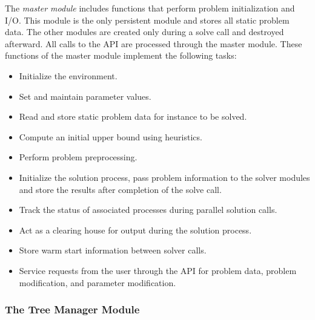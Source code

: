 The {\em master module} includes functions that perform problem initialization
and I/O. This module is the only persistent module and stores all static
problem data. The other modules are created only during a solve call and
destroyed afterward. All calls to the API are processed through the master
module. These functions of the master module implement the following tasks:
\begin{itemize}
        \item Initialize the environment.
        \item Set and maintain parameter values.
        \item Read and store static problem data for instance to be solved.
        \item Compute an initial upper bound using heuristics.
        \item Perform problem preprocessing.
        \item Initialize the solution process, pass problem information to the
        solver modules and store the results after completion of the solve 
	call.
        \item Track the status of associated processes during parallel
        solution calls.
        \item Act as a clearing house for output during the solution process.
        \item Store warm start information between solver calls.
        \item Service requests from the user through the API for problem data,
        problem modification, and parameter modification.
\end{itemize}

\subsubsection{The Tree Manager Module}


